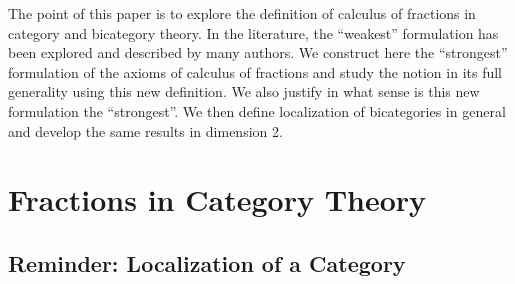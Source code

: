 \documentclass{article}
\numberwithin{equation}{section}
\theoremstyle{definition}
\theoremstyle{plain}
\begin{document}
The point of this paper is to explore the definition of calculus of fractions in category and bicategory theory. In the literature, the ``weakest'' formulation has been explored and described by many authors. We construct here the ``strongest'' formulation of the axioms of calculus of fractions and study the notion in its full generality using this new definition. We also justify in what sense is this new formulation the ``strongest''. We then define localization of bicategories in general and develop the same results in dimension 2.

\section{Fractions in Category Theory}

\subsection{Reminder: Localization of a Category}
\end{document}
